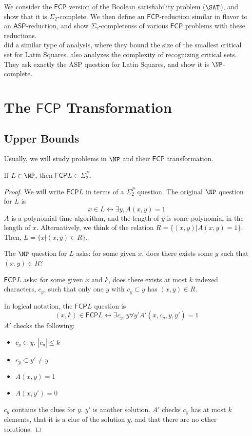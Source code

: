 \documentclass[runningheads,a4paper]{llncs}
\begin{document}
We consider the $\mathsf{FCP}$ version of the Boolean satisfiability problem ($\SAT$), and show that it is $\Sigma_2$-complete. We then define an $\mathsf{FCP}$-reduction similar in flavor to an $\mathsf{ASP}$-reduction, and show $\Sigma_2$-completenss of various $\mathsf{FCP}$ problems with these reductions.\\


\cite{Ghandehari2005121} did a similar type of analysis, where they bound the size of the smallest critical set for Latin Squares. \cite{1984computational} also analyzes the complexity of recognizing critical sets. They ask exactly the ASP question for Latin Squares, and show it is $\NP$-complete.


\section{The $\mathsf{FCP}$ Transformation}
\label{sec:prelim}

\subsection{Upper Bounds}

Usually, we will study problems in $\NP$ and their $\mathsf{FCP}$ transformation.

\begin{theorem}
\label{thm:satinsig2}
If $L \in \NP$, then $\mathsf{FCP} L \in \Sigma_2^P$. 
\end{theorem}

\begin{proof}
We will write $\mathsf{FCP} L$ in terms of a $\Sigma_2^P$ question. The original $\NP$ question for $L$ is
\[ x \in L \leftrightarrow \exists y, A(x, y) = 1 \]
$A$ is a polynomial time algorithm, and the length of $y$ is some polynomial in the length of $x$. Alternatively, we think of the relation $R = \{ (x, y) | A(x,y) = 1 \}$. Then, $L = \{ x | (x,y) \in R \}$. 

The $\NP$ question for $L$ asks: for some given $x$, does there exists some $y$ such that $(x, y) \in R$?

$\mathsf{FCP} L$ asks: for some given $x$ and $k$, does there exists at most $k$ indexed characters, $c_y$, such that only one $y$ with $c_y \subset y$ has $(x,y) \in R$. 

In logical notation, the $\mathsf{FCP} L$ question is
\[ (x, k) \in \mathsf{FCP} L \leftrightarrow \exists c_y, y \forall y' A'(x, c_y, y, y') = 1 \]
$A'$ checks the following:
\begin{itemize}
\item $c_y \subset y$, $|c_y| \leq k$
\item $c_y \subset y' \neq y$ 
\item $A(x,y) = 1$
\item $A(x, y') = 0$ 
\end{itemize}
$c_y$ contains the clues for $y$. $y'$ is another solution. $A'$ checks $c_y$ has at most $k$ elements, that it is a clue of the solution $y$, and that there are no other solutions.
\end{proof}
\end{document}
